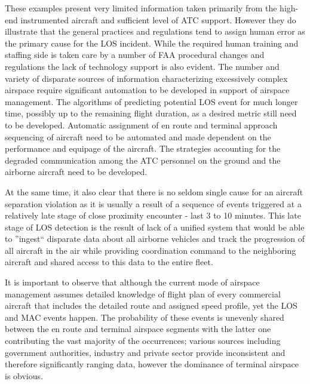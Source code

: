\documentclass[letter,onecolumn,12pt]{aiaa-tc}
\newcommand{\1}{1_n}
\begin{document}
These examples present very limited information taken primarily from the high-end instrumented aircraft and sufficient level of ATC support. However they do illustrate that the general practices and regulations tend to assign human error as the primary cause for the LOS incident. While the required human training and staffing side is taken care by a number of FAA procedural changes and regulations\cite{OIG_AR2013} the lack of technology support is also evident. The number and variety of disparate sources of information characterizing excessively complex airspace require significant automation to be developed in support of airspace management. The algorithms of predicting potential LOS event for much longer time, possibly up to the remaining flight duration, as a desired metric still need to be developed. Automatic assignment of en route and terminal approach sequencing of aircraft need to be automated and made dependent on the performance and equipage of the aircraft. The strategies accounting for the degraded communication among the ATC personnel on the ground and the airborne aircraft need to be developed.

At the same time, it also clear that there is no seldom single cause for an aircraft separation violation as it is usually a result of  a sequence of events triggered at a relatively late stage of close proximity encounter - last 3 to 10 minutes. This late stage of LOS detection is the result of lack of a unified system that would be able to ''ingest`` disparate data about all airborne vehicles and track the progression of all aircraft in the air while providing coordination command to the neighboring aircraft and shared access to this data to the entire fleet.

It is important to observe that although the current mode of airspace management assumes detailed knowledge of flight plan of every commercial aircraft that includes the detailed route and assigned speed profile, yet the LOS and MAC events happen. The probability of these events is unevenly shared between the en route and terminal airspace segments with the latter one contributing the vast majority of the occurrences; various sources including government authorities, industry and private sector provide inconsistent and therefore significantly ranging data, however the dominance of terminal airspace is obvious.
\end{document}
